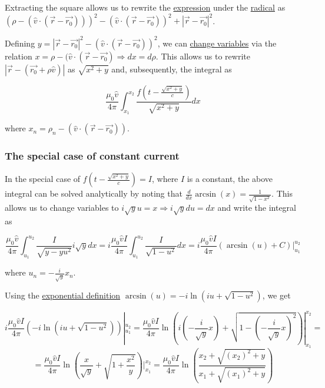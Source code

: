 ﻿\documentclass{article}
\begin{document}
Extracting the square allows us to rewrite the \href{https://en.wikipedia.org/wiki/Expression_(mathematics)}{expression} under the \href{https://en.wikipedia.org/wiki/Radical_symbol}{radical} as $(\rho - (\hat{v} \cdot (\vec{r} - \vec{r_0})))^2 - (\hat{v} \cdot (\vec{r} - \vec{r_0}))^2 + |\vec{r} - \vec{r_0}|^2$.

Defining $y = |\vec{r} - \vec{r_0}|^2 - (\hat{v} \cdot (\vec{r} - \vec{r_0}))^2$, we can \href{https://en.wikipedia.org/wiki/Change_of_variables}{change variables} via the relation $x = \rho - (\hat{v} \cdot (\vec{r} - \vec{r_0}) \Rightarrow dx = d \rho$. This allows us to rewrite $|\vec{r} - (\vec{r_0} + \rho \hat{v})|$ as $\sqrt{x^2 + y}$ and, subsequently, the integral as

\begin{equation*}
    \frac{\mu_0 \hat{v}}{4 \pi} \int_{x_1}^{x_2} \frac{f(t - \frac{\sqrt{x^2 + y}}{c})}{\sqrt{x^2 + y}} dx
\end{equation*}

where $x_n = \rho_n - (\hat{v} \cdot (\vec{r} - \vec{r_0}))$.

\subsubsection{The special case of constant current}

In the special case of $f(t - \frac{\sqrt{x^2 + y}}{c}) = I$, where $I$ is a constant, the above integral can be solved analytically by noting that $\frac{d}{dx} \arcsin(x) = \frac{1}{\sqrt{1-x^2}}$. This allows us to change variables to $i \sqrt{y} u = x \Rightarrow i \sqrt{y} du = dx$ and write the integral as

\begin{equation*}
    \frac{\mu_0 \hat{v}}{4 \pi} \int_{u_1}^{u_2} \frac{I}{\sqrt{y - y u^2}} i \sqrt{y} dx = i \frac{\mu_0 \hat{v} I}{4 \pi} \int_{u_1}^{u_2} \frac{I}{\sqrt{1 - u^2}} dx = i \frac{\mu_0 \hat{v} I}{4 \pi} (\arcsin(u) + C) |_{u_1}^{u_2}
\end{equation*}

where $u_n = - \frac{i}{\sqrt{y}} x_n$.

Using the \href{https://en.wikipedia.org/wiki/List_of_trigonometric_identities#Exponential_definitions}{exponential definition} $\arcsin(u) = -i\ln(iu + \sqrt{1 - u^2})$, we get

\begin{equation*}
    i \frac{\mu_0 \hat{v} I}{4 \pi} (-i\ln(iu + \sqrt{1 - u^2})) |_{u_1}^{u_2} = \frac{\mu_0 \hat{v} I}{4 \pi} \ln \left( i(- \frac{i}{\sqrt{y}} x) + \sqrt{1 - (- \frac{i}{\sqrt{y}} x)^2} \right) |_{x_1}^{x_2} =
\end{equation*}
\begin{equation*}
    = \frac{\mu_0 \hat{v} I}{4 \pi} \ln \left( \frac{x}{\sqrt{y}} + \sqrt{1 + \frac{x^2}{y}} \right) |_{x_1}^{x_2} = \frac{\mu_0 \hat{v} I}{4 \pi} \ln \left( \frac{x_2 + \sqrt{(x_2)^2 + y}}{x_1 + \sqrt{(x_1)^2 + y}} \right)
\end{equation*}
\end{document}
